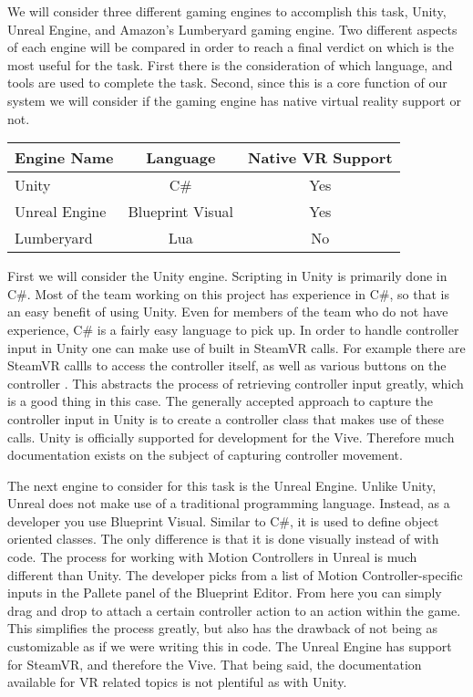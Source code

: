 \documentclass[10pt,journal,compsoc,onecolumn, draftclsnofoot]{IEEEtran}
\begin{document}
We will consider three different gaming engines to accomplish this task, Unity, Unreal Engine, and Amazon's Lumberyard gaming engine.
Two different aspects of each engine will be compared in order to reach a final verdict on which is the most useful for the task.
First there is the consideration of which language, and tools are used to complete the task.
Second, since this is a core function of our system we will consider if the gaming engine has native virtual reality support or not.

\vspace{2mm}
\begin{table}[h!]
\centering
  \begin{tabular}{ | l || c | c |  }
  \hline
  Engine Name & Language & Native VR Support\\
  \hline
  Unity  & C\# & Yes\\ \hline
  Unreal Engine & Blueprint Visual & Yes\\ \hline
  Lumberyard & Lua & No\\ \hline
  \hline
  \end{tabular}
\end{table}
\vspace{2mm}

First we will consider the Unity engine. Scripting in Unity is primarily done in C\#.
Most of the team working on this project has experience in C\#, so that is an easy benefit of using Unity.
Even for members of the team who do not have experience, C\# is a fairly easy language to pick up.
In order to handle controller input in Unity one can make use of built in SteamVR calls.
For example there are SteamVR callls to access the controller itself, as well as various buttons on the controller \cite{steamvr_controllers}.
This abstracts the process of retrieving controller input greatly, which is a good thing in this case.
The generally accepted approach to capture the controller input in Unity is to create a controller class that makes use of these calls.
Unity is officially supported for development for the Vive.
Therefore much documentation exists on the subject of capturing controller movement.

The next engine to consider for this task is the Unreal Engine.
Unlike Unity, Unreal does not make use of a traditional programming language.
Instead, as a developer you use Blueprint Visual.
Similar to C\#, it is used to define object oriented classes.
The only difference is that it is done visually instead of with code.
The process for working with Motion Controllers in Unreal is much different than Unity.
The developer picks from a list of Motion Controller-specific inputs in the Pallete panel of the Blueprint Editor\cite{unreal_controller}.
From here you can simply drag and drop to attach a certain controller action to an action within the game.
This simplifies the process greatly, but also has the drawback of not being as customizable as if we were writing this in code.
The Unreal Engine has support for SteamVR, and therefore the Vive.
That being said, the documentation available for VR related topics is not plentiful as with Unity.
\end{document}
